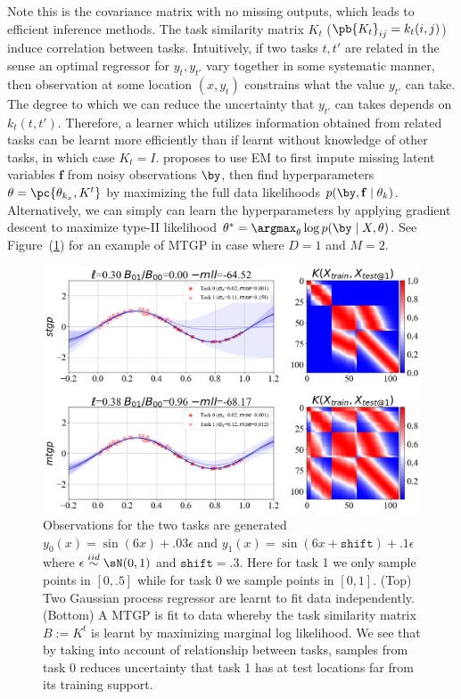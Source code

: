 \documentclass[11pt]{article}
\renewcommand\bf{\ensuremath{\mathbf{f}}}
\begin{document}
Note this is the covariance matrix with no missing outputs, which leads to efficient inference methods. The task similarity matrix $K_t$ ($\pb{K_t}_{ij} = k_t(i,j)$) induce correlation between tasks. Intuitively, if two tasks $t,t'$ are related in the sense an optimal regressor for $y_t,y_{t'}$ vary together in some systematic manner, then observation at some location $(x,y_t)$ constrains what the value $y_{t'}$ can take. The degree to which we can reduce the uncertainty that $y_{t'}$ can takes depends on $k_t(t,t')$. Therefore, a learner which utilizes information obtained from related tasks can be learnt more efficiently than if learnt without knowledge of other tasks, in which case $K_t = I$. \cite{bonillaMultitaskGaussianProcess2008} proposes to use EM to first impute missing latent variables $\bf$ from noisy observations $\by$, then find hyperparameters $\theta = \pc{ \theta_{k_x}, K^t }$ by maximizing the full data likelihoods $p(\by,\bf \mid \theta_{k})$. Alternatively, we can simply can learn the hyperparameters by applying gradient descent to maximize type-II likelihood $\theta^* = \argmax_{\theta} \log p(\by\mid X, \theta)$. See Figure~(\ref{fig:plt_mtgp_coorperative}) for an example of MTGP in case where $D=1$ and $M=2$.


\begin{center} 
\begin{figure}[h!]
    \includegraphics[width=\textwidth]{assets/plt_mtgp_coorperative.png}
    \caption{Observations for the two tasks are generated $y_0(x)=\sin(6x) + .03 \epsilon$ and $y_1(x)=\sin(6x + \texttt{shift}) + .1 \epsilon$ where $\epsilon\overset{iid}{\sim} \sN(0,1)$ and $\texttt{shift}=.3$. Here for task 1 we only sample points in $[0,.5]$ while for task 0 we sample points in $[0,1]$. (Top) Two Gaussian process regressor are learnt to fit data independently. (Bottom) A MTGP is fit to data whereby the task similarity matrix $B:=K^t$ is learnt by maximizing marginal log likelihood. We see that by taking into account of relationship between tasks, samples from task 0 reduces uncertainty that task 1 has at test locations far from its training support.}
    \label{fig:plt_mtgp_coorperative}
\end{figure}
\end{center} 
\end{document}
